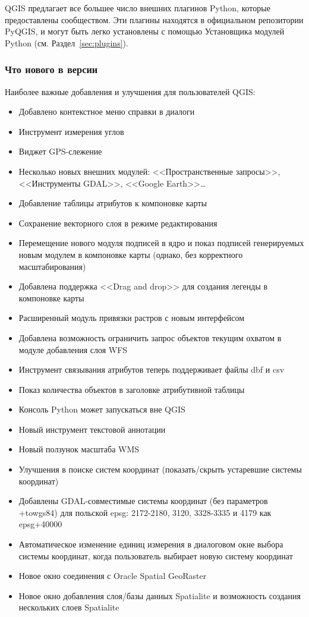 QGIS предлагает все большее число внешних плагинов Python, которые
предоставлены сообществом. Эти плагины находятся в официальном
репозитории PyQGIS, и могут быть легко установлены с помощью Установщика
модулей Python (см. Раздел~\ref{sec:plugins}).

\subsubsection{Что нового в версии \CURRENT}

Наиболее важные добавления и улучшения для пользователей QGIS:
\begin{itemize}[label=--]
 \item Добавлено контекстное меню справки в диалоги
 \item Инструмент измерения углов
 \item Виджет GPS-слежение
 \item Несколько новых внешних модулей: <<Пространственные запросы>>,
 <<Инструменты GDAL>>, <<Google Earth>>\dots
 \item Добавление таблицы атрибутов к компоновке карты
 \item Сохранение векторного слоя в режиме редактирования
 \item Перемещение нового модуля подписей в ядро и показ подписей
 генерируемых новым модулем в компоновке карты (однако, без корректного
 масштабирования)
 \item Добавлена поддержка <<Drag and drop>> для создания легенды в
 компоновке карты
 \item Расширенный модуль привязки растров с новым интерфейсом
 \item Добавлена возможность ограничить запрос объектов текущим охватом
 в модуле добавления слоя WFS
 \item Инструмент связывания атрибутов теперь поддерживает файлы dbf
 и csv %
 \item Показ количества объектов в заголовке атрибутивной таблицы
 \item Консоль Python может запускаться вне QGIS
 \item Новый инструмент текстовой аннотации
 \item Новый ползунок масштаба WMS
 \item Улучшения в поиске систем координат (показать/скрыть устаревшие
 системы координат)
 \item Добавлены GDAL-совместимые системы координат (без параметров
 +towgs84) для польской epsg: 2172-2180, 3120, 3328-3335 и 4179 как
 epsg+40000
 \item Автоматическое изменение единиц измерения в диалоговом окне
 выбора системы координат, когда пользователь выбирает новую систему
 координат
 \item Новое окно соединения с Oracle Spatial GeoRaster
 \item Новое окно добавления слоя/базы данных Spatialite и возможность
 создания нескольких слоев Spatialite

\end{itemize}

